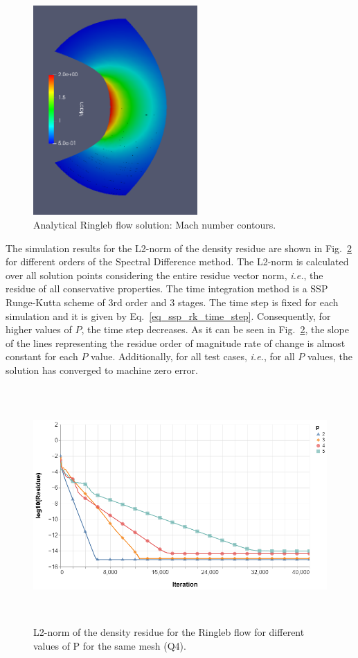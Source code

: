 \begin{figure}[H]
	\centering
	\includegraphics[height=8.0cm]{figs/results/ringleb/solution/ringleb_initial_solution.png}
    \caption{Analytical Ringleb flow solution: Mach number contours.}
    \label{fig:ringleb_analytical_solution}
\end{figure}

The simulation results for the L2-norm of the density residue are shown in Fig.\ \ref{fig:ringleb_residue} for different orders of the Spectral Difference method. The L2-norm is calculated over all solution points considering the entire residue vector norm, {\em i.e.}, the residue of all conservative properties. The time integration method is a SSP Runge-Kutta scheme of 3rd order and 3 stages. The time step is fixed for each simulation and it is given by Eq.\ \ref{eq_ssp_rk_time_step}. Consequently, for higher values of $P$, the time step decreases. As it can be seen in Fig.\ \ref{fig:ringleb_residue}, the slope of the lines representing the residue order of magnitude rate of change is almost constant for each $P$ value. Additionally, for all test cases, {\em i.e.}, for all $P$ values, the solution has converged to machine zero error.

\begin{figure}[H]
	\centering
	\includegraphics[height=9.0cm]{figs/results/ringleb/ringleb_residue_by_p.png}
    \caption{L2-norm of the density residue for the Ringleb flow for different values of P for the same mesh (Q4).}
    \label{fig:ringleb_residue}
\end{figure}

